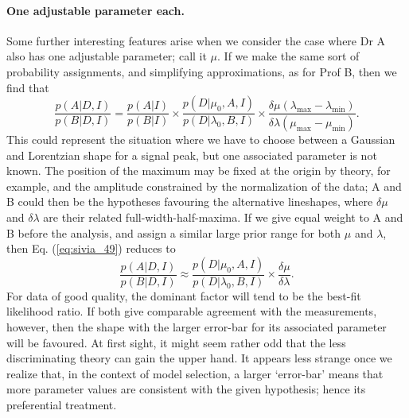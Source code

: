 \documentclass[%
oneside,                 %
final,                   %
10pt]{article}
\begin{document}
\paragraph{One adjustable parameter each.}
Some further interesting features arise when we consider the case where Dr A also has one adjustable parameter; call it $\mu$. If we make the same sort of probability assignments, and simplifying approximations, as for Prof B, then we find that
\begin{equation}
\frac{p(A|D,I)}{p(B|D,I)} =  \frac{p(A|I)}{p(B|I)} \times \frac{p(D|\mu_0,A,I)}{p(D|\lambda_0,B,I)} \times \frac{\delta\mu(\lambda_\mathrm{max} - \lambda_\mathrm{min})}{\delta\lambda(\mu_\mathrm{max} - \mu_\mathrm{min})}. 
\label{eq:sivia_49}
\end{equation}
This could represent the situation where we have to choose between a Gaussian and Lorentzian shape for a signal peak, but one associated parameter is not known. The position of the maximum may be fixed at the origin by theory, for example, and the amplitude constrained by the normalization of the data; A and B could then be the hypotheses favouring the alternative lineshapes, where $\delta\mu$ and $\delta\lambda$ are their related full-width-half-maxima. If we give equal weight to A and B before the analysis, and assign a similar large prior range for both $\mu$ and $\lambda$, then Eq. (\ref{eq:sivia_49}) reduces to
$$
\frac{p(A|D,I)}{p(B|D,I)} \approx  \frac{p(D|\mu_0,A,I)}{p(D|\lambda_0,B,I)} \times \frac{\delta\mu}{\delta\lambda}. 
$$
For data of good quality, the dominant factor will tend to be the best-fit likelihood ratio. If both give comparable agreement with the measurements, however, then the shape with the larger error-bar for its associated parameter will be favoured. At first sight, it might seem rather odd that the less discriminating theory can gain the upper hand. It appears less strange once we realize that, in the context of model selection, a larger ‘error-bar’ means that more parameter values are consistent with the given hypothesis; hence its preferential treatment.
\end{document}
